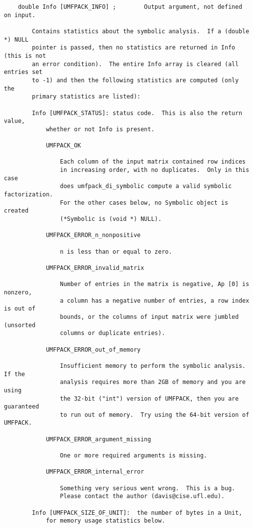 \documentclass[11pt]{article}
\begin{document}
{\begin{verbatim}
    double Info [UMFPACK_INFO] ;        Output argument, not defined on input.

        Contains statistics about the symbolic analysis.  If a (double *) NULL
        pointer is passed, then no statistics are returned in Info (this is not
        an error condition).  The entire Info array is cleared (all entries set
        to -1) and then the following statistics are computed (only the
        primary statistics are listed):

        Info [UMFPACK_STATUS]: status code.  This is also the return value,
            whether or not Info is present.

            UMFPACK_OK

                Each column of the input matrix contained row indices
                in increasing order, with no duplicates.  Only in this case
                does umfpack_di_symbolic compute a valid symbolic factorization.
                For the other cases below, no Symbolic object is created
                (*Symbolic is (void *) NULL).

            UMFPACK_ERROR_n_nonpositive

                n is less than or equal to zero.

            UMFPACK_ERROR_invalid_matrix

                Number of entries in the matrix is negative, Ap [0] is nonzero,
                a column has a negative number of entries, a row index is out of
                bounds, or the columns of input matrix were jumbled (unsorted
                columns or duplicate entries).

            UMFPACK_ERROR_out_of_memory

                Insufficient memory to perform the symbolic analysis.  If the
                analysis requires more than 2GB of memory and you are using
                the 32-bit ("int") version of UMFPACK, then you are guaranteed
                to run out of memory.  Try using the 64-bit version of UMFPACK.

            UMFPACK_ERROR_argument_missing

                One or more required arguments is missing.

            UMFPACK_ERROR_internal_error

                Something very serious went wrong.  This is a bug.
                Please contact the author (davis@cise.ufl.edu).

        Info [UMFPACK_SIZE_OF_UNIT]:  the number of bytes in a Unit,
            for memory usage statistics below.


\end{verbatim}}
\end{document}
